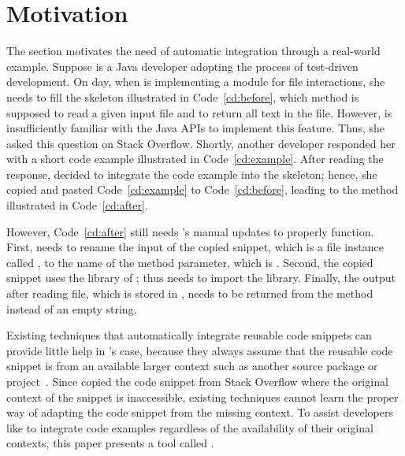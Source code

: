 \section{Motivation}
The section motivates the need of automatic integration through a real-world
example. Suppose \developer{} is a Java developer adopting the process of
test-driven development. On day, when \developer{} is implementing a module for
file interactions, she needs to fill the skeleton illustrated in
Code~\ref{cd:before}, which method is supposed to read a given input file and to
return all text in the file. However, \developer{} is insufficiently familiar with the Java APIs to
implement this feature. Thus, she asked this question on Stack Overflow.
Shortly, another developer responded her with a short code example illustrated
in Code~\ref{cd:example}. After reading the response, \developer{} decided to
integrate the code example into the skeleton; hence, she copied and pasted
Code~\ref{cd:example} to Code~\ref{cd:before}, leading to the method illustrated in
Code~\ref{cd:after}.

However, Code~\ref{cd:after} still needs \developer{}'s manual updates to
properly function. First, \developer{} needs to rename the input of the copied
snippet, which is a file instance called , to the name of the
method parameter, which is . Second, the copied snippet
uses the library of ; thus \developer{} needs to import the
library. Finally, the output after reading file, which is stored in
, needs to be returned from the method instead of an empty
string.

Existing techniques that automatically integrate reusable code snippets can
provide little help in \developer{}'s case, because they always assume that the
reusable code snippet is from an available larger context such as another source
package or project~\cite{Cottrell1, Hou, Holmes4}. Since \developer{} copied
the code snippet from Stack Overflow where the original context of the snippet is inaccessible,
existing techniques cannot learn the proper way of adapting the code snippet
from the missing context. To assist developers like \developer{} to integrate
code examples regardless of the availability of their original contexts, this paper
presents a tool called \toolname{}.



